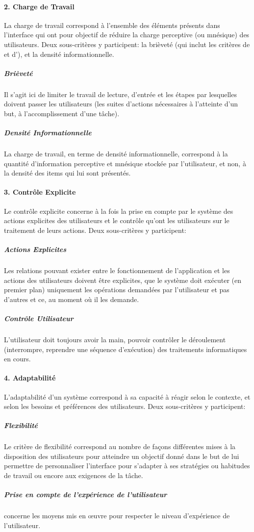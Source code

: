         \paragraph{2. Charge de Travail}
            La charge de travail correspond à l’ensemble des éléments présents dans l’interface qui ont pour objectif de réduire la charge perceptive (ou mnésique) des utilisateurs. Deux sous-critères y participent: la brièveté (qui inclut les critères de  et d'), et la densité informationnelle.
            \subparagraph{Brièveté}
                Il s’agit ici de limiter  le travail de lecture, d’entrée et les étapes par lesquelles doivent passer les utilisateurs (\ie les suites d’actions nécessaires à l’atteinte d’un but, à l’accomplissement d’une tâche).
            \subparagraph{Densité Informationnelle}
                La charge de travail, en terme de densité informationnelle, correspond à la quantité d'information perceptive et mnésique stockée par l'utilisateur, et non, à la densité des items qui lui sont présentés.
        \paragraph{3. Contrôle Explicite}
            Le contrôle explicite concerne à la fois la prise en compte par le système des actions explicites des utilisateurs et le contrôle qu’ont les utilisateurs sur le traitement de leurs actions. Deux sous-critères y participent:
            \subparagraph{Actions Explicites}
                Les relations pouvant exister entre le fonctionnement de l’application et les actions des utilisateurs doivent être explicites, \cad que le système doit exécuter (en premier plan) uniquement les opérations demandées par l’utilisateur et pas d’autres et ce, au moment où il les demande.
            \subparagraph{Contrôle Utilisateur}
                L’utilisateur doit toujours avoir la main, pouvoir contrôler le déroulement (\eg interrompre, reprendre une séquence d'exécution) des traitements informatiques en cours.
        \paragraph{4. Adaptabilité}
            L'adaptabilité d’un système correspond à sa capacité à réagir selon le contexte, et selon les besoins et préférences des utilisateurs. Deux sous-critères y participent:
            \subparagraph{Flexibilité}
                Le critère de flexibilité correspond au nombre de façons différentes mises à la disposition des utilisateurs pour atteindre un objectif donné dans le but de lui permettre de personnaliser l’interface pour s'adapter à ses stratégies ou habitudes de travail ou encore aux exigences de la tâche.
            \subparagraph{Prise en compte de l’expérience de l’utilisateur}
                concerne les moyens mis en œuvre pour respecter le niveau d’expérience de l’utilisateur.
